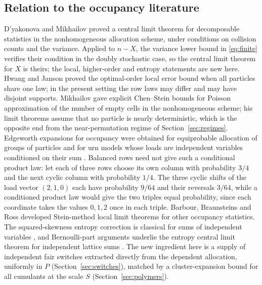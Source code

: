 \documentclass[11pt,a4paper]{article}
\theoremstyle{definition}\newtheorem{remark}[theorem]{Remark}\newtheorem{conjecture}{Conjecture}
\begin{document}
\subsection{Relation to the occupancy literature}\label{sec:literature}
D'yakonova and Mikhailov \cite[Theorem~5]{dm} proved a central limit theorem for decomposable statistics in the nonhomogeneous allocation scheme, under conditions on collision counts and the variance. Applied to $n-X$, the variance lower bound in \eqref{eq:finite} verifies their condition in the doubly stochastic case, so the central limit theorem for $X$ is theirs; the local, higher-order and entropy statements are new here. Hwang and Janson \cite[Theorem~2.1]{hj} proved the optimal-order local error bound when all particles share one law; in the present setting the row laws may differ and may have disjoint supports. Mikhailov \cite[Theorem~1]{mik} gave explicit Chen--Stein bounds for Poisson approximation of the number of empty cells in the nonhomogeneous scheme; his limit theorems assume that no particle is nearly deterministic, which is the opposite end from the near-permutation regime of Section~\ref{sec:regimes}. Edgeworth expansions for occupancy were obtained for equiprobable allocation of groups of particles \cite{mm,ke} and for urn models whose loads are independent variables conditioned on their sum \cite{mjm}. Balanced rows need not give such a conditional product law: let each of three rows choose its own column with probability $3/4$ and the next cyclic column with probability $1/4$. The three cyclic shifts of the load vector $(2,1,0)$ each have probability $9/64$ and their reversals $3/64$, while a conditioned product law would give the two triples equal probability, since each coordinate takes the values $0,1,2$ once in each triple. Barbour, Braunsteins and Ross \cite{bbr} developed Stein-method local limit theorems for other occupancy statistics. The squared-skewness entropy correction is classical for sums of independent variables \cite{vd,bcg}, and Bernoulli-part arguments underlie the entropy central limit theorem for independent lattice sums \cite{gk}. The new ingredient here is a supply of independent fair switches extracted directly from the dependent allocation, uniformly in $P$ (Section~\ref{sec:switches}), matched by a cluster-expansion bound for all cumulants at the scale $S$ (Section~\ref{sec:polymers}).
\end{document}
